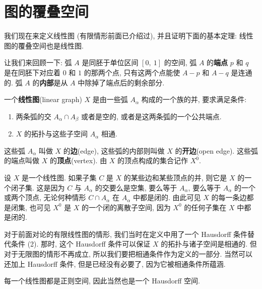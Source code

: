 ﻿\section{图的覆叠空间}
\label{ch14-sec83}

我们现在来定义线性图 (有限情形前面已介绍过), 并且证明下面的基本定理: 线性图的覆叠空间也是线性图.

让我们来回顾一下: 弧 $A$ 是同胚于单位区间 $[0,\ 1]$ 的空间, 弧 $A$ 的\textbf{端点} $p$ 和 $q$ 是在同胚下对应着 $0$ 和 $1$ 的那两个点, 只有这两个点能使 $A-p$ 和 $A-q$ 是连通的. 弧 $A$ 的\textbf{内部}是从 $A$ 中除掉了端点后的剩余部分.

\begin{definition}[线性图]
\label{definition:ch14-linear-graph}
一个\textbf{线性图}(linear graph) $X$ 是由一些弧 $A_{\alpha}$ 构成的一个族的并, 要求满足条件:
\begin{enumerate}[(1)]
\item 两条弧的交 $A_{\alpha}\cap A_{\beta}$ 或者是空的, 或者是这两条弧的一个公共端点.
\item $X$ 的拓扑与这些子空间 $A_{\alpha}$ 相通.
\end{enumerate}
这些弧 $A_{\alpha}$ 叫做 $X$ 的\textbf{边}(edge), 这些弧的内部则叫做 $X$ 的\textbf{开边}(open edge). 这些弧的端点叫做 $X$ 的\textbf{顶点}(vertex). 由 $X$ 的顶点构成的集合记作 $X^{0}$.
\end{definition}

设 $X$ 是一个线性图. 如果子集 $C$ 是 $X$ 的某些边和某些顶点的并, 则它是 $X$ 的一个闭子集. 这是因为 $C$ 与 $A_{\alpha}$ 的交要么是空集, 要么等于 $A_{\alpha}$, 要么等于 $A_{\alpha}$ 的一个或两个顶点, 无论何种情形 $C\cap A_{\alpha}$ 在 $A_{\alpha}$ 中都是闭的. 由此可见 $X$ 的每一条边都是闭集, 也可见 $X^{0}$ 是 $X$ 的一个闭的离散子空间, 因为 $X^{0}$ 的任何子集在 $X$ 中都是闭的.

对于前面对论的有限线性图的情形, 我们当时在定义中用了一个 Hausdorff 条件替代条件 (2). 那时, 这个 Hausdorff 条件可以保证 $X$ 的拓扑与诸子空间是相通的. 但对于无限图的情形不再成立, 所以我们要把相通条件作为定义的一部分. 当然可以还加上 Hausdorff 条件, 但是已经没有必要了, 因为它被相通条件所蕴涵.

\begin{lemma}[线性图是正则空间]
\label{lemma:ch14-graph-regular}
每一个线性图都是正则空间, 因此当然也是一个 Hausdorff 空间.
\end{lemma}

